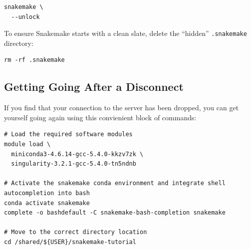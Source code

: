 \begin{lstlisting}
snakemake \
  --unlock
\end{lstlisting}

To ensure Snakemake starts with a clean slate, delete the ``hidden'' \texttt{.snakemake} directory:

\begin{lstlisting}
rm -rf .snakemake
\end{lstlisting}

\subsection{Getting Going After a Disconnect}

If you find that your connection to the server has been dropped, you can get yourself going again using this convienient block of commands:

\begin{lstlisting}
# Load the required software modules
module load \
  miniconda3-4.6.14-gcc-5.4.0-kkzv7zk \
  singularity-3.2.1-gcc-5.4.0-tn5ndnb

# Activate the snakemake conda environment and integrate shell autocompletion into bash
conda activate snakemake
complete -o bashdefault -C snakemake-bash-completion snakemake

# Move to the correct directory location
cd /shared/${USER}/snakemake-tutorial
\end{lstlisting}
